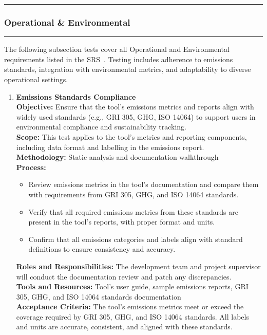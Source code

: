 \documentclass[12pt, titlepage]{article}
\newcommand{\colorrule}{\textcolor{BlueViolet}{\rule{\linewidth}{2pt}}}
\begin{document}
\noindent
\colorrule

\subsubsection{Operational \& Environmental}
\colorrule

\medskip

\noindent
The following subsection tests cover all Operational and Environmental requirements listed in the SRS~\cite{SRS}. Testing includes adherence to emissions standards, integration with environmental metrics, and adaptability to diverse operational settings.

\begin{enumerate}[label={\bf \textcolor{Maroon}{test-OPE-\arabic*}}, wide=0pt, font=\itshape]
  \item \textbf{Emissions Standards Compliance} \\[2mm]
    \textbf{Objective:} Ensure that the tool’s emissions metrics and reports align with widely used standards (e.g., GRI 305, GHG, ISO 14064) to support users in environmental compliance and sustainability tracking. \\[2mm]
    \textbf{Scope:} This test applies to the tool's metrics and reporting components, including data format and labelling in the emissions report. \\[2mm]
    \textbf{Methodology:} Static analysis and documentation walkthrough \\[2mm]
    \textbf{Process:}
    \begin{itemize}
      \item Review emissions metrics in the tool’s documentation and compare them with requirements from GRI 305, GHG, and ISO 14064 standards.
      \item Verify that all required emissions metrics from these standards are present in the tool’s reports, with proper format and units.
      \item Confirm that all emissions categories and labels align with standard definitions to ensure consistency and accuracy.
    \end{itemize}
    \textbf{Roles and Responsibilities:} The development team and project supervisor will conduct the documentation review and patch any discrepancies. \\[2mm]
    \textbf{Tools and Resources:} Tool’s user guide, sample emissions reports, GRI 305, GHG, and ISO 14064 standards documentation \\[2mm]
    \textbf{Acceptance Criteria:} The tool’s emissions metrics meet or exceed the coverage required by GRI 305, GHG, and ISO 14064 standards. All labels and units are accurate, consistent, and aligned with these standards.



\end{enumerate}
\end{document}
